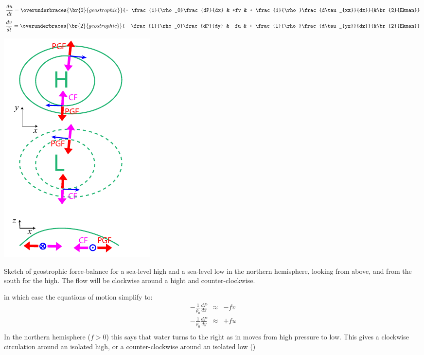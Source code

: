 \begin{equation}
    \frac{du}{dt} = \overunderbraces{\br{2}{geostrophic}}
    {- \frac{1}{\rho_0}\frac{dP}{dx} & +fv & + \frac{1}{\rho}\frac{d\tau_{xz}}{dz}}
    {&\br{2}{Ekman}}
\end{equation}
\begin{equation}
    \frac{dv}{dt} = \overunderbraces{\br{2}{geostrophic}}
    {- \frac{1}{\rho_0}\frac{dP}{dy} & -fu & + \frac{1}{\rho}\frac{d\tau_{yz}}{dz}}
    {&\br{2}{Ekman}}
\end{equation}
\begin{marginfigure}
    \includegraphics{figs/Geostrophic/BalanceSketch}
    \caption{Sketch of geostrophic force-balance for a sea-level high and a sea-level low in the northern hemisphere, looking from above, and from the south for the high.  The flow will be clockwise around a hight and counter-clockwise.}
    \label{fig:BalanceSketch}  
\end{marginfigure}
in which case the equations of motion simplify to:
\begin{eqnarray*}
    -\frac{1}{\rho_0}\frac{dP}{dx} & \approx & -fv\\
    -\frac{1}{\rho_0}\frac{dP}{dy} & \approx & +fu\\    
\end{eqnarray*}
In the northern hemisphere ($f>0$) this says that water turns to the right as in moves from high pressure to low.  This gives a clockwise circulation around an isolated high, or a counter-clockwise around an isolated low ()

